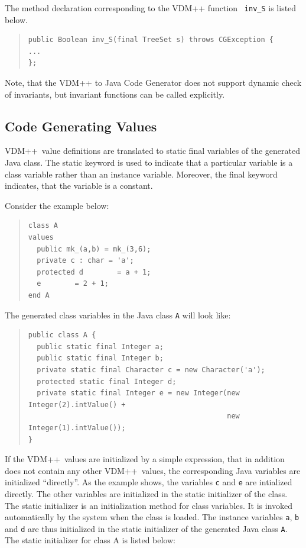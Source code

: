 \documentclass[\pformat,11pt]{article}
\newcommand{\VDM}{VDM++}
\newcommand{\cg}{VDM++ to Java Code Generator}
\begin{document}
The method declaration corresponding to the \VDM{} function {\tt
  inv\_S} is listed below.

\begin{quote}
\begin{verbatim}
public Boolean inv_S(final TreeSet s) throws CGException {
...
};
\end{verbatim}
\end{quote}

Note, that the \cg{} does not support dynamic check of invariants, but
invariant functions can be called explicitly.

\subsection{Code Generating Values}
\label{values}

\VDM\ value definitions are translated to static final variables of
the generated Java class. The static keyword is used
to indicate that a particular variable is a class variable rather than
an instance variable. Moreover, the final keyword indicates, that the variable is a constant.

Consider the example below:

\begin{quote}
\begin{verbatim}
class A
values
  public mk_(a,b) = mk_(3,6);
  private c : char = 'a';
  protected d        = a + 1;
  e        = 2 + 1;
end A
\end{verbatim}
\end{quote}

The generated class variables in the Java class {\tt A} will look like:

\begin{quote}
\begin{small}
\begin{verbatim}
public class A {
  public static final Integer a;
  public static final Integer b;
  private static final Character c = new Character('a');
  protected static final Integer d;
  private static final Integer e = new Integer(new Integer(2).intValue() + 
                                               new Integer(1).intValue());
}
\end{verbatim}
\end{small}
\end{quote}

If the \VDM\ values are initialized by a simple expression, that in
addition does not contain any other \VDM\ values, the corresponding
Java variables are initialized ``directly''. As the example shows, the
variables {\tt c} and {\tt e} are intialized directly.  The other
variables are initialized in the static initializer of the class. The
static initializer is an initialization method for class variables. It
is invoked automatically by the system when the class is loaded.  The
instance variables {\tt a}, {\tt b} and {\tt d} are thus initialized
in the static initializer of the generated Java class {\tt A}.  The static
initializer for class A is listed below:
\end{document}
